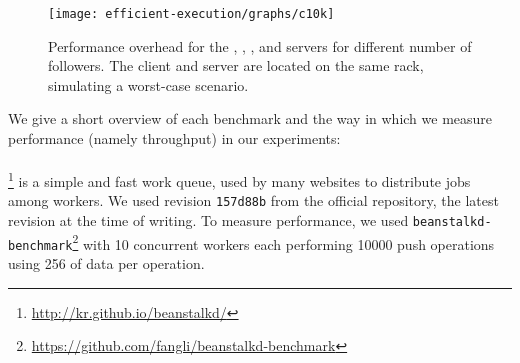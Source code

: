 

\begin{figure}[!t]
 \centering
 \texttt{[image: efficient-execution/graphs/c10k]}
 \caption{Performance overhead for the \beanstalkd, \lighttpd, \memcached, \nginx
   and \redis servers for different number of followers.  The client
   and server are located on the same rack, simulating a worst-case scenario.}
 \label{fig:servers}
\end{figure}

We give a short overview of each benchmark and the way in which we
measure performance (namely throughput) in our experiments:

\paragraph{\beanstalkd}\footnote{\url{http://kr.github.io/beanstalkd/}}
is a simple and fast work queue, used by many websites to
distribute jobs among workers. We used revision \lstinline`157d88b` from the
official \git repository, the latest revision at the time of
writing.  To measure performance, we used
\lstinline`beanstalkd-benchmark`\footnote{\url{https://github.com/fangli/beanstalkd-benchmark}}
with \num{10} concurrent workers each performing \num{10000} push operations
using \SI{256}{\byte} of data per operation.


